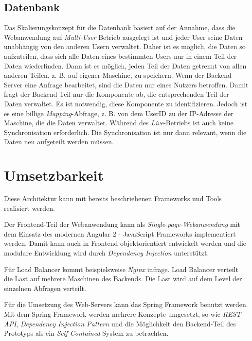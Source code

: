 \subsection{Datenbank}

Das Skalierungskonzept für die Datenbank basiert auf der Annahme, dass die Webanwendung auf \textit{Multi-User} Betrieb ausgelegt ist und jeder User seine Daten unabhängig von den anderen Usern verwaltet. Daher ist es möglich, die Daten so aufzuteilen, dass sich alle Daten eines bestimmten Users nur in einem Teil der Daten wiederfinden. Dann ist es möglich, jeden Teil der Daten getrennt von allen anderen Teilen, z. B. auf eigener Maschine, zu speichern. Wenn der Backend-Server eine Anfrage bearbeitet, sind die Daten nur eines Nutzers betroffen. Damit fragt der Backend-Teil nur die Komponente ab, die entsprechenden Teil der Daten verwaltet. Es ist notwendig, diese Komponente zu identifizieren. Jedoch ist es eine billige \textit{Mapping}-Abfrage, z. B. von dem UserID zu der IP-Adresse der Maschine, die die Daten verwaltet. Während des \textit{Live}-Betriebs ist auch keine Synchronisation erforderlich. Die Synchronisation ist nur dann relevant, wenn die Daten neu aufgeteilt werden müssen.

\section{Umsetzbarkeit}
Diese Architektur kann mit bereits beschriebenen Frameworks und Tools realisiert werden.

Der Frontend-Teil der Webanwendung kann als \textit{Single-page-Webanwendung} mit dem Einsatz des modernen Angular 2 - JavaScript Frameworks implementiert werden. Damit kann auch in Frontend objektorientiert entwickelt werden und die modulare Entwicklung wird durch \textit{Dependency Injection} unterstützt. 

Für Load Balancer kommt beispielsweise \textit{Nginx} \cite{nginx} infrage. Load Balancer verteilt die Last auf mehrere Maschinen des Backends. Die Last wird auf dem Level der einzelnen Abfragen verteilt. 

Für die Umsetzung des Web-Servers kann das Spring Framework benutzt werden. Mit dem Spring Framework werden mehrere Konzepte umgesetzt, so wie \textit{REST API}, \textit{Dependency Injection Pattern} und die Möglichkeit den Backend-Teil des Prototyps als ein \textit{Self-Contained} System zu betrachten.

